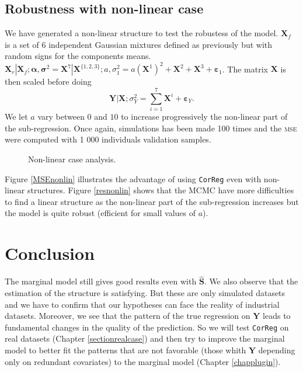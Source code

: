 \documentclass[12pt,a4paper]{report}
\begin{document}
\subsection{Robustness with non-linear case}

We have generated a non-linear structure to test the robustess of the model. $\boldsymbol{X}_f$ is a set of 6 independent Gaussian mixtures defined as previously but with random signs for the components means. $\boldsymbol{X}_r|\boldsymbol{X}_f;\boldsymbol{\alpha},\boldsymbol{\sigma}^2=\boldsymbol{X}^7|\boldsymbol{X}^{\{1,2,3\}};a,\sigma_1^2=a(\boldsymbol{X}^1)^2+\boldsymbol{X}^2+\boldsymbol{X}^3+ \boldsymbol{\varepsilon}_1$. The matrix $\boldsymbol{X}$ is then scaled before doing $$\boldsymbol{Y}|\boldsymbol{X};\sigma_Y^2=\sum_{i=1}^7\boldsymbol{X}^i+\boldsymbol{\varepsilon}_Y.$$ We let $a$ vary between $0$ and $10$ to increase progressively the non-linear part of the sub-regression. Once again, simulations has been made 100 times and the \textsc{mse} were computed with 1 000 individuals validation samples.

 \begin{figure}[h!] 
   \caption{Non-linear case analysis.}
\end{figure}
Figure \ref{MSEnonlin} illustrates the advantage of using {\tt CorReg} even with non-linear structures. Figure \ref{resnonlin} shows that the MCMC have more difficulties to find a linear structure as the non-linear part of the sub-regression increases but the model is quite robust (efficient for small values of $a$).

	\FloatBarrier	

	\section{Conclusion} The marginal model still gives good results even with $\hat{\boldsymbol{S}}$. We also observe that the estimation of the structure is satisfying. But these are only simulated datasets and we have to confirm that our hypotheses can face the reality of industrial datasets. Moreover, we see that the pattern of the true regression on $\boldsymbol{Y}$ leads to fundamental changes in the quality of the prediction.	So we will test {\tt CorReg} on real datasets (Chapter \ref{sectionrealcase}) and then try to improve the marginal model to better fit the patterns that are not favorable (those whith $\boldsymbol{Y}$ depending only on redundant covariates) to the marginal model (Chapter \ref{chapplugin}).
		
\end{document}
